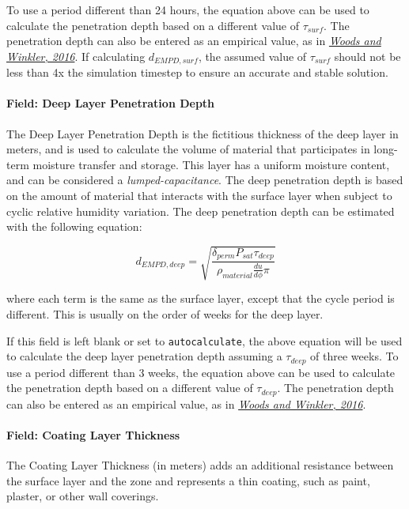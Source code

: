 To use a period different than 24 hours, the equation above can be used to calculate the penetration depth based on a different value of $\tau_{surf}$. The penetration depth can also be entered as an empirical value, as in \href{http://dx.doi.org/10.1016/j.enbuild.2016.02.008}{\emph{Woods and Winkler, 2016}}. If calculating $d_{EMPD,surf}$, the assumed value of $\tau_{surf}$ should not be less than 4x the simulation timestep to ensure an accurate and stable solution.

\paragraph{Field: Deep Layer Penetration Depth}\label{field-deep-layer-penetration-depth}

The Deep Layer Penetration Depth is the fictitious thickness of the deep layer in meters, and is used to calculate the volume of material that participates in long-term moisture transfer and storage. This layer has a uniform moisture content, and can be considered a \emph{lumped-capacitance}. The deep penetration depth is based on the amount of material that interacts with the surface layer when subject to cyclic relative humidity variation. The deep penetration depth can be estimated with the following equation:

\[ d_{EMPD,deep} = \sqrt{\frac{\delta_{perm} P_{sat} \tau_{deep}} {\rho_{material} \frac{du}{d\phi} \pi}} \]

where each term is the same as the surface layer, except that the cycle period is different. This is usually on the order of weeks for the deep layer.

If this field is left blank or set to \texttt{autocalculate}, the above equation will be used to calculate the deep layer penetration depth assuming a $\tau_{deep}$ of three weeks. To use a period different than 3 weeks, the equation above can be used to calculate the penetration depth based on a different value of $\tau_{deep}$. The penetration depth can also be entered as an empirical value, as in \href{http://dx.doi.org/10.1016/j.enbuild.2016.02.008}{\emph{Woods and Winkler, 2016}}.

\paragraph{Field: Coating Layer	Thickness}\label{field-coating-layer-thickness}

The Coating Layer Thickness (in meters) adds an additional resistance between the surface layer and the zone and represents a thin coating, such as paint, plaster, or other wall coverings.

